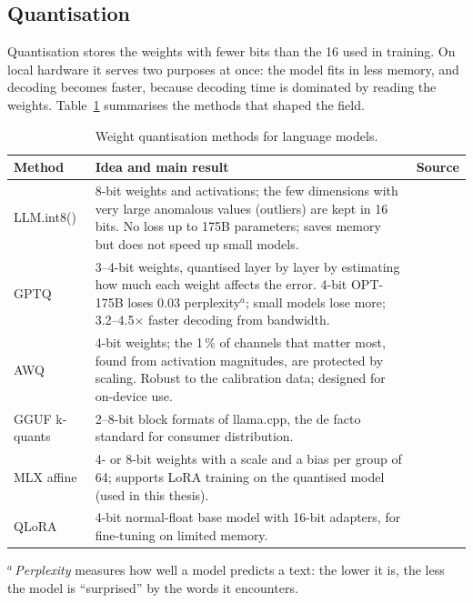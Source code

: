 \subsection{Quantisation}
\label{sec:local-quantisation}

Quantisation stores the weights with fewer bits than the 16 used in training. On local hardware it serves two purposes
at once: the model fits in less memory, and decoding becomes faster, because decoding time is dominated by reading the
weights. Table~\ref{tab:local-quant} summarises the methods that shaped the field.

\begin{table}[htbp]
\centering
\caption{Weight quantisation methods for language models.}
\label{tab:local-quant}
\small
\begin{tabularx}{\textwidth}{@{}lXl@{}}
\toprule
Method & Idea and main result & Source \\
\midrule
LLM.int8() & 8-bit weights and activations; the few dimensions with very large anomalous values (outliers) are kept in
16 bits. No loss up to 175B parameters; saves memory but does not speed up small models. & \cite{dettmers2022llmint8} \\
GPTQ & 3--4-bit weights, quantised layer by layer by estimating how much each weight affects the error. 4-bit OPT-175B
loses 0.03 perplexity$^{a}$; small models lose more; 3.2--4.5$\times$ faster decoding from
bandwidth. & \cite{frantar2023gptq} \\
AWQ & 4-bit weights; the 1\,\% of channels that matter most, found from activation magnitudes, are protected by scaling.
Robust to the calibration data; designed for on-device use. & \cite{lin2024awq} \\
GGUF k-quants & 2--8-bit block formats of llama.cpp, the de facto standard for consumer distribution. & \cite{llamacpp} \\
MLX affine & 4- or 8-bit weights with a scale and a bias per group of 64; supports LoRA training on the quantised model
(used in this thesis). & \cite{mlxlm} \\
QLoRA & 4-bit normal-float base model with 16-bit adapters, for fine-tuning on limited memory. & \cite{dettmers2023qlora} \\
\bottomrule
\end{tabularx}

\smallskip
{\footnotesize\raggedright $^{a}$\,\emph{Perplexity} measures how well a model predicts a text: the lower it is, the less
the model is ``surprised'' by the words it encounters.\par}
\end{table}

